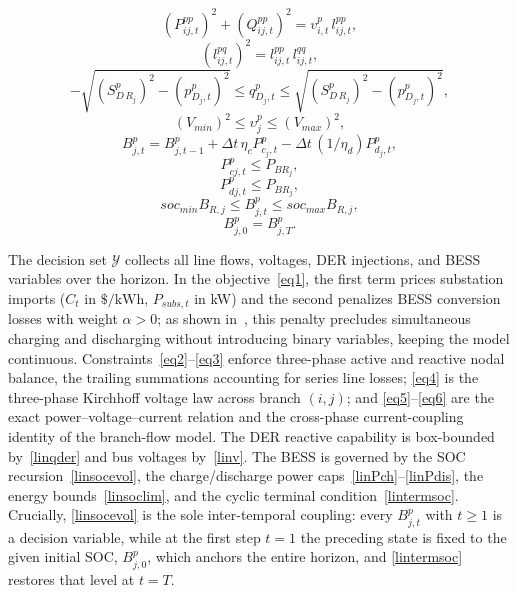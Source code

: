 \begin{equation}\label{eq5}
\left( P_{ij,t}^{pp} \right)^2 + \left( Q_{ij,t}^{pp} \right)^2
= v_{i,t}^p \, l_{ij,t}^{pp},
\end{equation}
\begin{equation}\label{eq6}
\left( l_{ij,t}^{pq} \right)^2 = l_{ij,t}^{pp} \, l_{ij,t}^{qq},
\end{equation}
\begin{equation}\label{linqder}
{ - \sqrt {{{\left( {S_{D\,R_j}^p} \right)}^2} - {{\left( {p_{D_j,t}^p} \right)}^2}} \le q_{D_j,t}^p \le \sqrt {{{\left( {S_{D\,R_j}^p} \right)}^2} - {{\left( {p_{D_j,t}^p} \right)}^2}}},
\end{equation}
\begin{equation}\label{linv}
{\left( {{V_{min}}} \right)^2} \le {\upsilon}_j^p \le {\left( {{V_{max}}} \right)^2},
\end{equation}
\begin{equation}\label{linsocevol}
B_{j,t}^{p} = B_{j,t-1}^{p} + \Delta t\, \eta_c P_{c_j,t}^{p} - \Delta t\, (1/\eta_d) P_{d_j,t}^{p},
\end{equation}
\begin{equation}\label{linPch}
P_{cj,t}^{p} \le P_{BR_j},
\end{equation}
\begin{equation}\label{linPdis}
P_{dj,t}^{p} \le P_{BR_j},
\end{equation}
\begin{equation} \label{linsoclim}
soc_{min}B_{R,j} \le B_{j,t}^p \le  soc_{max}B_{R,j},
\end{equation}
\begin{equation}\label{lintermsoc}
B_{j,0}^{p} = B_{j,T}^{p}.
\end{equation}

The decision set $\mathcal{Y}$ collects all line flows, voltages, DER
injections, and BESS variables over the horizon. In the
objective~\eqref{eq1}, the first term prices substation imports ($C_t$
in $\$/\mathrm{kWh}$, $P_{subs,t}$ in kW) and the second penalizes BESS
conversion losses with weight $\alpha>0$; as shown in~\cite{Nazir}, this
penalty precludes simultaneous charging and discharging without
introducing binary variables, keeping the model continuous.
Constraints~\eqref{eq2}--\eqref{eq3} enforce three-phase active and
reactive nodal balance, the trailing summations accounting for series
line losses; \eqref{eq4} is the three-phase Kirchhoff voltage law across
branch $(i,j)$; and \eqref{eq5}--\eqref{eq6} are the exact
power--voltage--current relation and the cross-phase current-coupling
identity of the branch-flow model. The DER reactive capability is
box-bounded by~\eqref{linqder} and bus voltages by~\eqref{linv}. The
BESS is governed by the SOC recursion~\eqref{linsocevol}, the
charge/discharge power caps~\eqref{linPch}--\eqref{linPdis}, the energy
bounds~\eqref{linsoclim}, and the cyclic terminal
condition~\eqref{lintermsoc}. Crucially, \eqref{linsocevol} is the sole
inter-temporal coupling: every $B^{p}_{j,t}$ with $t\ge1$ is a decision
variable, while at the first step $t=1$ the preceding state is fixed to
the given initial SOC, $B^{p}_{j,0}$, which anchors the entire horizon,
and \eqref{lintermsoc} restores that level at $t=T$.

